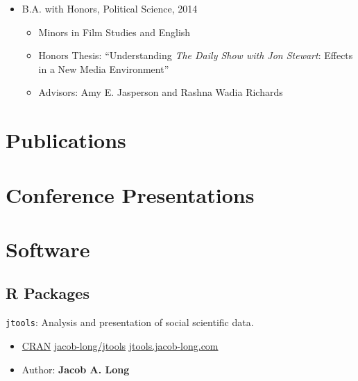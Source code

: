 \documentclass[letterpaper,MMMyyyy,nonstopmode]{simplecv}
\def\tightlist{} %
\begin{document}
\begin{Body}
\begin{itemize}
\item
  B.A. with Honors, Political Science, 2014

  \begin{itemize}
  \tightlist
  \item
    Minors in Film Studies and English
  \item
    Honors Thesis: \enquote{Understanding \emph{The Daily Show with Jon
    Stewart}: Effects in a New Media Environment}
  \item
    Advisors: Amy E. Jasperson and Rashna Wadia Richards
  \end{itemize}
\end{itemize}

\hypertarget{publications}{%
\section{Publications}\label{publications}}


\hypertarget{conference-presentations}{%
\section{Conference Presentations}\label{conference-presentations}}


\newpage

\hypertarget{software}{%
\section{Software}\label{software}}

\hypertarget{r-packages}{%
\subsection{R Packages}\label{r-packages}}

\texttt{jtools}: Analysis and presentation of social scientific data.

\small
\vspace{-.05in}

\begin{itemize}
\item
  \href{https://CRAN.R-project.org/package=jtools}{CRAN} \hspace{.03in}
  \textbullet \hspace{.05in} \faGithub \hspace{.02in}
  \href{https://github.com/jacob-long/jtools}{jacob-long/jtools}
  \hspace{.03in} \textbullet \hspace{.05in} \faGlobe \hspace{.02in}
  \href{https://jtools.jacob-long.com}{jtools.jacob-long.com}
\item
  Author: \textbf{Jacob A. Long}


\end{itemize}
\end{Body}
\end{document}
